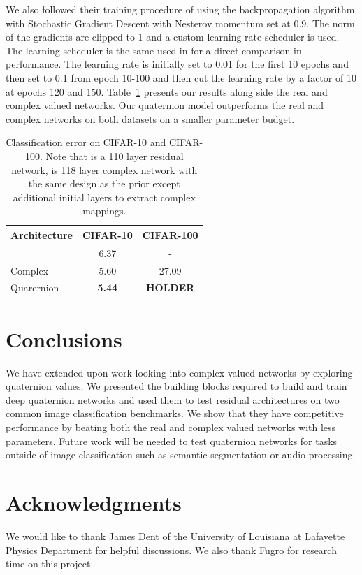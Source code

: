 \documentclass[14pt,a4paper]{article}
\begin{document}
We also followed their training procedure of using the backpropagation algorithm with Stochastic Gradient Descent with Nesterov momentum \cite{nesterov1983method} set at 0.9.
The norm of the gradients are clipped to 1 and a custom learning rate scheduler is used.
The learning scheduler is the same used in \cite{trabelsi2017deep} for a direct comparison in performance.
The learning rate is initially set to 0.01 for the first 10 epochs and then set to 0.1 from epoch 10-100 and then cut the learning rate by a factor of 10 at epochs 120 and 150.
Table~\ref{t:results} presents our results along side the real and complex valued networks.
Our quaternion model outperforms the real and complex networks on both datasets on a smaller parameter budget.

\begin{table}
	\centering
		\begin{tabular}{l c c}
			\hline
			Architecture & CIFAR-10 & CIFAR-100 \\
			\hline
			\cite{he2016deep} & 6.37 & - \\
			\cite{trabelsi2017deep} Complex & 5.60 & 27.09 \\
			Quarernion & \textbf{5.44} & \textbf{HOLDER}
		\end{tabular}
	\caption{Classification error on CIFAR-10 and CIFAR-100. Note that \cite{he2016deep} is a 110 layer residual network, \cite{trabelsi2017deep} is 118 layer complex network with the same design as the prior except additional initial layers to extract complex mappings.}
	\label{t:results}
\end{table}

\section{Conclusions}
We have extended upon work looking into complex valued networks by exploring quaternion values.
We presented the building blocks required to build and train deep quaternion networks and used them to test residual architectures on two common image classification benchmarks.
We show that they have competitive performance by beating both the real and complex valued networks with less parameters.
Future work will be needed to test quaternion networks for tasks outside of image classification such as semantic segmentation or audio processing.


\section{Acknowledgments}
We would like to thank James Dent of the University of Louisiana at Lafayette Physics Department for helpful discussions.
We also thank Fugro for research time on this project.
\end{document}
